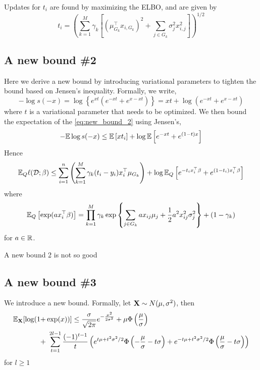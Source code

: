 Updates for $t_i$ are found by maximizing the ELBO, and are given by
\begin{equation}
    t_i = \left( 
	\sum_{k=1}^M \gamma_k \left[
	    (\mu_{G_k}^\top x_{i, G_k})^2 + \sum_{j \in G_k} \sigma_{j}^2 x_{i, j}^2
	\right]
    \right)^{1/2}
\end{equation}


\subsection{A new bound \#2}

Here we derive a new bound by introducing variational parameters to tighten the bound based on Jensen's inequality. Formally, we write,
\begin{equation} \label{eq:new_bound_2}
    -\log s(-x) 
    = \log \left\{ e^{x t} \left( e^{-x t} + e^{x - x t} \right) \right\}
    = x t + \log \left( e^{-x t} + e^{x - x t} \right)
\end{equation}
where $t$ is a variational parameter that needs to be optimized. We then bound the expectation of the \eqref{eq:new_bound_2} using Jensen's,
\begin{equation}
    -\mathbb{E} \log s(-x)
    \leq
    \mathbb{E} \left[ x t_i \right] + \log \mathbb{E} \left[ e^{-x t} + e^{(1-t)x} \right]
\end{equation}
Hence
\begin{equation}
    \mathbb{E}_Q \ell (\mathcal{D}; \beta) 
    \leq 
    \sum_{i=1}^n 
    \left( \sum_{k=1}^M \gamma_k (t_i - y_i) x^\top_i \mu_{G_k} \right)
    +
    \log \mathbb{E}_Q \left[ e^{-t_i x_i^\top \beta} + e^{(1-t_i)x_i^\top \beta} \right]
\end{equation}
where
\begin{equation*}
    \mathbb{E}_Q \left[ \exp(a x_i^\top \beta) \right]
    =	
	\prod_{k=1}^M \gamma_k \exp \left\{ 
	    \sum_{j \in G_k} 
	    a x_{ij} \mu_{j}
	    + 
	    \frac{1}{2} a^2 x_{ij}^2 \sigma_{j}^2
	\right\}
	+
	(1- \gamma_k)
\end{equation*}
for $a \in \mathbb{R}$.

A new bound 2 is not so good


\subsection{A new bound \#3}

We introduce a new bound. Formally, let $\mathbf{X} \sim N(\mu, \sigma^2)$, then
\begin{equation} \label{eq:new_tight}
\begin{aligned}
    \mathbb{E}_{\mathbf{X}} [ \log(1 + & \exp(x)) ]
	\leq
	    \frac{\sigma}{\sqrt{2\pi}} e^{- \frac{\mu^2}{2 \sigma^2}}
	    + \mu \Phi \left(\frac{\mu}{\sigma} \right) 
	\\
	+ &\
	    \sum_{t=1}^{2l-1} 
		\frac{(-1)^{t-1}}{t} \left(
		    e^{t \mu + t^2 \sigma^2 / 2 }  \Phi \left( -\frac{\mu}{\sigma} - t \sigma \right) 
		  + e^{-t \mu + t^2 \sigma^2 /2 } \Phi \left( \frac{\mu}{\sigma} -  t \sigma \right)
		\right)
\end{aligned}
\end{equation}
for $l \geq 1$

